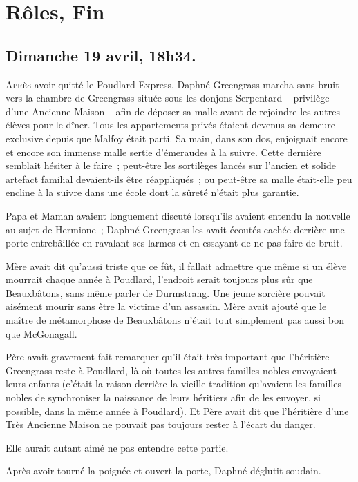 \chapter{Rôles, Fin}

\section{Dimanche 19 avril, 18h34.}

\lettrine{A}{près} avoir quitté le Poudlard Express, Daphné Greengrass marcha sans bruit vers la chambre de Greengrass située sous les donjons Serpentard -- privilège d'une Ancienne Maison -- afin de déposer sa malle avant de rejoindre les autres élèves pour le dîner. Tous les appartements privés étaient devenus sa demeure exclusive depuis que Malfoy était parti. Sa main, dans son dos, enjoignait encore et encore son immense malle sertie d'émeraudes à la suivre. Cette dernière semblait hésiter à le faire~; peut-être les sortilèges lancés sur l'ancien et solide artefact familial devaient-ils être réappliqués~; ou peut-être sa malle était-elle peu encline à la suivre dans une école dont la sûreté n'était plus garantie.

Papa et Maman avaient longuement discuté lorsqu'ils avaient entendu la nouvelle au sujet de Hermione~; Daphné Greengrass les avait écoutés cachée derrière une porte entrebâillée en ravalant ses larmes et en essayant de ne pas faire de bruit.

Mère avait dit qu'aussi triste que ce fût, il fallait admettre que même si un élève mourrait chaque année à Poudlard, l'endroit serait toujours plus sûr que Beauxbâtons, sans même parler de Durmstrang. Une jeune sorcière pouvait aisément mourir sans être la victime d'un assassin. Mère avait ajouté que le maître de métamorphose de Beauxbâtons n'était tout simplement pas aussi bon que McGonagall.

Père avait gravement fait remarquer qu'il était très important que l'héritière Greengrass reste à Poudlard, là où toutes les autres familles nobles envoyaient leurs enfants (c'était la raison derrière la vieille tradition qu'avaient les familles nobles de synchroniser la naissance de leurs héritiers afin de les envoyer, si possible, dans la même année à Poudlard). Et Père avait dit que l'héritière d'une Très Ancienne Maison ne pouvait pas toujours rester à l'écart du danger.

Elle aurait autant aimé ne pas entendre cette partie.

Après avoir tourné la poignée et ouvert la porte, Daphné déglutit soudain.

